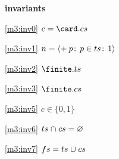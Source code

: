 \textbf{invariants}
\begin{block}
\item[ \eqref{m3:inv0} ]{$c = \card.cs $} %
\item[ \eqref{m3:inv1} ]{$n = { \langle + \:p\!:\, p \in ts\!:\, 1 \rangle } $} %
\item[ \eqref{m3:inv2} ]{$\finite.ts $} %
\item[ \eqref{m3:inv3} ]{$\finite.cs $} %
\item[ \eqref{m3:inv5} ]{$c \in \{0,1\} $} %
\item[ \eqref{m3:inv6} ]{$ts \mathbin{\mkern1mu\cap\mkern1mu} cs = \mathord\varnothing $} %
\item[ \eqref{m3:inv7} ]{$fs = ts \mathbin{\mkern1mu\cup\mkern1mu} cs $} %
\end{block}
